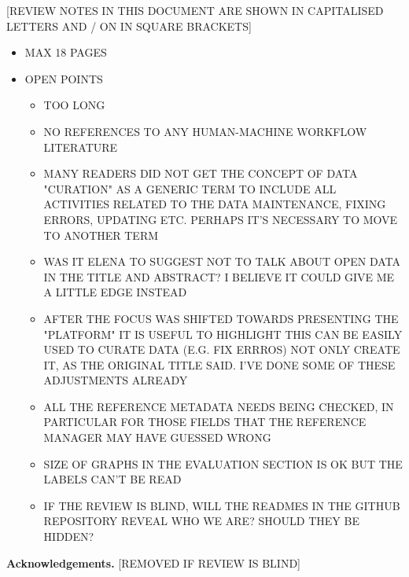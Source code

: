 \documentclass{llncs}
\begin{document}
[REVIEW NOTES IN THIS DOCUMENT ARE SHOWN IN CAPITALISED LETTERS AND / ON IN SQUARE BRACKETS] 
\begin{itemize}

    \item MAX 18 PAGES
    \item OPEN POINTS
        \begin{itemize}
            \item TOO LONG
            \item NO REFERENCES TO ANY HUMAN-MACHINE WORKFLOW LITERATURE
            \item MANY READERS DID NOT GET THE CONCEPT OF DATA "CURATION" AS A GENERIC TERM TO INCLUDE ALL ACTIVITIES RELATED TO THE DATA MAINTENANCE, FIXING ERRORS, UPDATING ETC.  PERHAPS IT'S NECESSARY TO MOVE TO ANOTHER TERM
            \item WAS IT ELENA TO SUGGEST NOT TO TALK ABOUT OPEN DATA IN THE TITLE AND ABSTRACT? I BELIEVE IT COULD GIVE ME A LITTLE EDGE INSTEAD
            \item AFTER THE FOCUS WAS SHIFTED TOWARDS PRESENTING THE "PLATFORM" IT IS USEFUL TO HIGHLIGHT THIS CAN BE EASILY USED TO CURATE DATA (E.G. FIX ERRROS) NOT ONLY CREATE IT, AS THE ORIGINAL TITLE SAID. I'VE DONE SOME OF THESE ADJUSTMENTS ALREADY
            \item ALL THE REFERENCE METADATA NEEDS BEING CHECKED, IN PARTICULAR FOR THOSE FIELDS THAT THE REFERENCE MANAGER MAY HAVE GUESSED WRONG
            \item SIZE OF GRAPHS IN THE EVALUATION SECTION IS OK BUT THE LABELS CAN'T BE READ
            \item IF THE REVIEW IS BLIND, WILL THE READMES IN THE GITHUB REPOSITORY REVEAL WHO WE ARE? SHOULD THEY BE HIDDEN?
        \end{itemize}
\end{itemize}









\textbf{Acknowledgements.} [REMOVED IF REVIEW IS BLIND]


\end{document}
